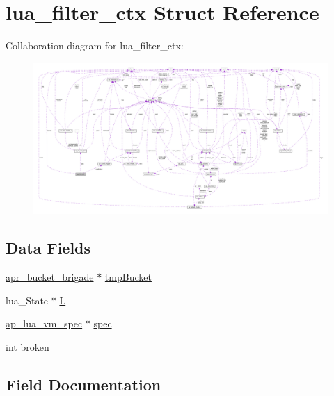 \hypertarget{structlua__filter__ctx}{}\section{lua\+\_\+filter\+\_\+ctx Struct Reference}
\label{structlua__filter__ctx}


Collaboration diagram for lua\+\_\+filter\+\_\+ctx\+:
\nopagebreak
\begin{figure}[H]
\begin{center}
\leavevmode
\includegraphics[width=350pt]{structlua__filter__ctx__coll__graph}
\end{center}
\end{figure}
\subsection*{Data Fields}
\begin{DoxyCompactItemize}
\item 
\hyperlink{structapr__bucket__brigade}{apr\+\_\+bucket\+\_\+brigade} $\ast$ \hyperlink{structlua__filter__ctx_a0cddc3ee7e26e721a1508197a3319aa0}{tmp\+Bucket}
\item 
lua\+\_\+\+State $\ast$ \hyperlink{structlua__filter__ctx_ac60c8d100d063cc00acc3ab39c436301}{L}
\item 
\hyperlink{structap__lua__vm__spec}{ap\+\_\+lua\+\_\+vm\+\_\+spec} $\ast$ \hyperlink{structlua__filter__ctx_a8c89666aa33dd299464577e166f2c115}{spec}
\item 
\hyperlink{pcre_8txt_a42dfa4ff673c82d8efe7144098fbc198}{int} \hyperlink{structlua__filter__ctx_a011e7c5e2e101a31ff9ca32626bce653}{broken}
\end{DoxyCompactItemize}


\subsection{Field Documentation}
